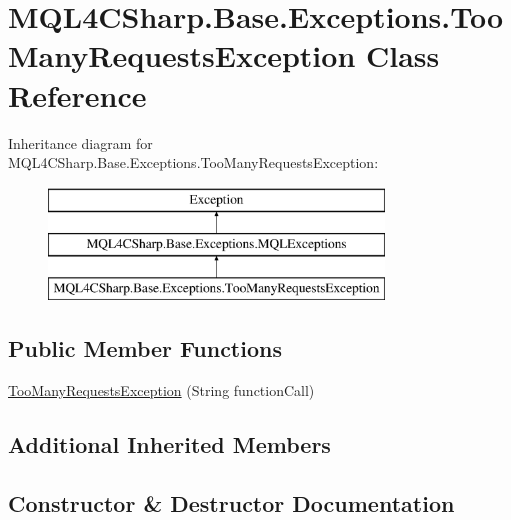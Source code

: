 \hypertarget{class_m_q_l4_c_sharp_1_1_base_1_1_exceptions_1_1_too_many_requests_exception}{}\section{M\+Q\+L4\+C\+Sharp.\+Base.\+Exceptions.\+Too\+Many\+Requests\+Exception Class Reference}
\label{class_m_q_l4_c_sharp_1_1_base_1_1_exceptions_1_1_too_many_requests_exception}
Inheritance diagram for M\+Q\+L4\+C\+Sharp.\+Base.\+Exceptions.\+Too\+Many\+Requests\+Exception\+:\begin{figure}[H]
\begin{center}
\leavevmode
\includegraphics[height=3.000000cm]{class_m_q_l4_c_sharp_1_1_base_1_1_exceptions_1_1_too_many_requests_exception}
\end{center}
\end{figure}
\subsection*{Public Member Functions}
\begin{DoxyCompactItemize}
\item 
\hyperlink{class_m_q_l4_c_sharp_1_1_base_1_1_exceptions_1_1_too_many_requests_exception_ad62099c86ac316f263dc73a6b6aaf635}{Too\+Many\+Requests\+Exception} (String function\+Call)
\end{DoxyCompactItemize}
\subsection*{Additional Inherited Members}


\subsection{Constructor \& Destructor Documentation}
